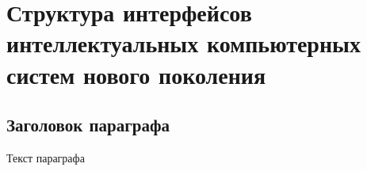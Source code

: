 
\chapter{Структура интерфейсов интеллектуальных компьютерных систем нового поколения}
\label{chapter_interfaces}


\section{Заголовок параграфа}
Текст параграфа

%